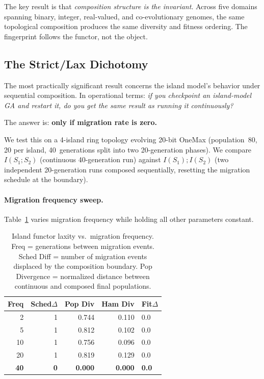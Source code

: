 \documentclass[sigconf]{acmart}
\begin{document}
The key result is that \emph{composition structure is the invariant}. Across five domains spanning binary, integer, real-valued, and co-evolutionary genomes, the same topological composition produces the same diversity and fitness ordering. The fingerprint follows the functor, not the object.

\subsection{The Strict/Lax Dichotomy}
\label{sec:dichotomy}

The most practically significant result concerns the island model's behavior under sequential composition. In operational terms: \emph{if you checkpoint an island-model GA and restart it, do you get the same result as running it continuously?}

The answer is: \textbf{only if migration rate is zero.}

We test this on a 4-island ring topology evolving 20-bit OneMax (population~80, 20 per island, 40~generations split into two 20-generation phases). We compare $I(S_1 ; S_2)$ (continuous 40-generation run) against $I(S_1) ; I(S_2)$ (two independent 20-generation runs composed sequentially, resetting the migration schedule at the boundary).

\paragraph{Migration frequency sweep.}
Table~\ref{tab:laxity} varies migration frequency while holding all other parameters constant.

\begin{table}[ht]
\centering
\caption{Island functor laxity vs.\ migration frequency. Freq = generations between migration events. Sched Diff = number of migration events displaced by the composition boundary. Pop Divergence = normalized distance between continuous and composed final populations.}
\label{tab:laxity}
\small
\begin{tabular}{@{}rrrrl@{}}
\toprule
\textbf{Freq} & \textbf{Sched$\Delta$} & \textbf{Pop Div} & \textbf{Ham Div} & \textbf{Fit$\Delta$} \\
\midrule
2  & 1 & 0.744          & 0.110 & 0.0 \\
5  & 1 & 0.812          & 0.102 & 0.0 \\
10 & 1 & 0.756          & 0.096 & 0.0 \\
20 & 1 & 0.819          & 0.129 & 0.0 \\
\textbf{40} & \textbf{0} & \textbf{0.000} & \textbf{0.000} & \textbf{0.0} \\
\bottomrule
\end{tabular}
\end{table}
\end{document}
